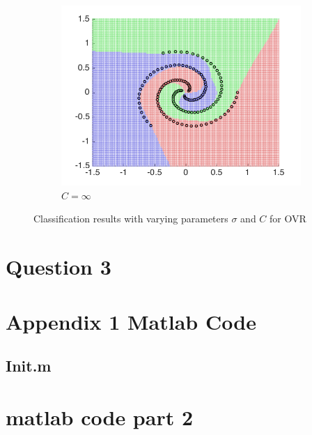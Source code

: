 \documentclass[10pt,twocolumn,letterpaper]{article}
\begin{document}
\begin{figure}
\begin{subfigure}[H]{0.3 \columnwidth}
		\includegraphics[width = 1\columnwidth]{q2_ovr_Cinf}
		\caption{$C = \infty$}
	\end{subfigure}
	
	\caption{Classification results with varying parameters $\sigma$ and $C$ for OVR}
	\label{fig:q2_ovr_all}
\end{figure}



\section{Question 3}




{\small


}

\onecolumn
\appendix
\section{Appendix 1 Matlab Code}
\subsection{Init.m}


\section{matlab code part 2}

\end{document}
